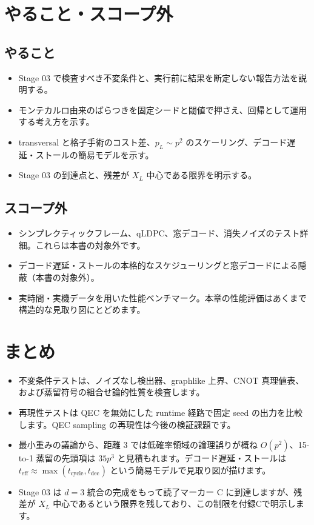 \section{やること・スコープ外}\label{ch25:scope}

\subsection{やること}

\begin{itemize}
  \item Stage 03 で検査すべき不変条件と、実行前に結果を断定しない報告方法を説明する。
  \item モンテカルロ由来のばらつきを固定シードと閾値で押さえ、回帰として運用する考え方を示す。
  \item transversal と格子手術のコスト差、$p_L \sim p^2$ のスケーリング、デコード遅延・ストールの簡易モデルを示す。
  \item Stage 03 の到達点と、残差が $X_L$ 中心である限界を明示する。
\end{itemize}

\subsection{スコープ外}

\begin{itemize}
  \item シンプレクティックフレーム、qLDPC、窓デコード、消失ノイズのテスト詳細。これらは本書の対象外です。
  \item デコード遅延・ストールの本格的なスケジューリングと窓デコードによる隠蔽（本書の対象外）。
  \item 実時間・実機データを用いた性能ベンチマーク。本章の性能評価はあくまで構造的な見取り図にとどめます。
\end{itemize}

\section{まとめ}\label{ch25:summary}

\begin{itemize}
  \item 不変条件テストは、ノイズなし検出器、graphlike 上界、CNOT 真理値表、および蒸留符号の組合せ論的性質を検査します。
  \item 再現性テストは QEC を無効にした runtime 経路で固定 seed の出力を比較します。QEC sampling の再現性は今後の検証課題です。
  \item 最小重みの議論から、距離 3 では低確率領域の論理誤りが概ね $O(p^2)$、15-to-1 蒸留の先頭項は $35p^3$ と見積もれます。デコード遅延・ストールは $t_{\mathrm{eff}} \approx \max(t_{\mathrm{cycle}}, t_{\mathrm{dec}})$ という簡易モデルで見取り図が描けます。
  \item Stage 03 は $d=3$ 統合の完成をもって読了マーカー C に到達しますが、残差が $X_L$ 中心であるという限界を残しており、この制限を付録Cで明示します。
\end{itemize}

